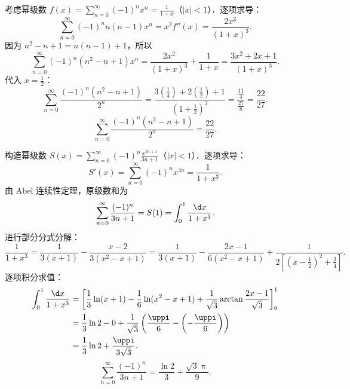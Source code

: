 \begin{solution}
    考虑幂级数 $f(x) = \sum_{n=0}^\infty (-1)^n x^n = \frac{1}{1 + x}$（$|x| < 1$）．逐项求导：
    \begin{equation}
        \sum_{n=0}^\infty (-1)^n n(n-1) x^n = x^2 f''(x) = \frac{2x^2}{(1 + x)^3}.
    \end{equation}
    因为 $n^2 - n + 1 = n(n-1) + 1$，所以
    \begin{equation}
        \sum_{n=0}^\infty (-1)^n (n^2 - n + 1)x^n = \frac{2x^2}{(1 + x)^3} + \frac{1}{1 + x} = \frac{3x^2 + 2x + 1}{(1 + x)^3}.
    \end{equation}
    代入 $x = \frac{1}{2}$：
    \begin{equation}
        \sum_{n=0}^\infty \frac{(-1)^n(n^2 - n + 1)}{2^n} = \frac{3\left(\frac{1}{4}\right) + 2\left(\frac{1}{2}\right) + 1}{\left(1 + \frac{1}{2}\right)^3} = \frac{\frac{11}{4}}{\frac{27}{8}} = \frac{22}{27}.
    \end{equation}
    \begin{equation}
        \boxed{\sum_{n=0}^\infty \frac{(-1)^n(n^2 - n + 1)}{2^n} = \frac{22}{27}.}
    \end{equation}


    构造幂级数 $S(x) = \sum_{n=0}^\infty (-1)^n \frac{x^{3n+1}}{3n+1}$（$|x| < 1$）．逐项求导：
    \begin{equation}
        S'(x) = \sum_{n=0}^\infty (-1)^n x^{3n} = \frac{1}{1 + x^3}.
    \end{equation}
    由 Abel 连续性定理，原级数和为
    \begin{equation}
        \sum_{n=0}^\infty \frac{(-1)^n}{3n+1} = S(1) = \int_0^1 \frac{\d x}{1 + x^3}.
    \end{equation}
    进行部分分式分解：
    \begin{equation}
        \frac{1}{1 + x^3} = \frac{1}{3(x + 1)} - \frac{x - 2}{3(x^2 - x + 1)} = \frac{1}{3(x + 1)} - \frac{2x - 1}{6(x^2 - x + 1)} + \frac{1}{2\left[\left(x - \frac{1}{2}\right)^2 + \frac{3}{4}\right]}.
    \end{equation}
    逐项积分求值：
    \begin{equation}
        \begin{aligned}
            \int_0^1 \frac{\d x}{1 + x^3} & = \left[ \frac{1}{3}\ln(x + 1) - \frac{1}{6}\ln(x^2 - x + 1) + \frac{1}{\sqrt{3}}\arctan\frac{2x - 1}{\sqrt{3}} \right]_0^1 \\
                                          & = \frac{1}{3}\ln 2 - 0 + \frac{1}{\sqrt{3}}\left( \frac{\uppi}{6} - \left(-\frac{\uppi}{6}\right) \right)                   \\
                                          & = \frac{1}{3}\ln 2 + \frac{\uppi}{3\sqrt{3}}.
        \end{aligned}
    \end{equation}
    \begin{equation}
        \boxed{\sum_{n=0}^\infty \frac{(-1)^n}{3n + 1} = \frac{\ln 2}{3} + \frac{\sqrt{3}\uppi}{9}.}
    \end{equation}


\end{solution}
